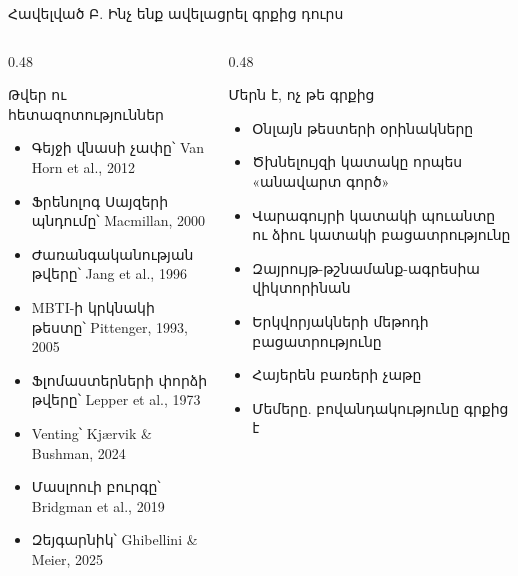 \begin{frame}{Հավելված Բ. Ինչ ենք ավելացրել գրքից դուրս}
  \begin{columns}[T]
    \begin{column}{0.48\textwidth}
      \begin{card}[colback=mint!30!cardwhite, fontupper=\scriptsize]
        {\blackfont Թվեր ու հետազոտություններ}\par\smallskip
        \begin{itemize}\setlength{\itemsep}{0.3mm}
          \item Գեյջի վնասի չափը՝ Van Horn et al., 2012
          \item Ֆրենոլոգ Սայզերի պնդումը՝ Macmillan, 2000
          \item Ժառանգականության թվերը՝ Jang et al., 1996
          \item MBTI-ի կրկնակի թեստը՝ Pittenger, 1993, 2005
          \item Ֆլոմաստերների փորձի թվերը՝ Lepper et al., 1973
          \item Venting՝ Kjærvik \& Bushman, 2024
          \item Մասլոուի բուրգը՝ Bridgman et al., 2019
          \item Զեյգարնիկ՝ Ghibellini \& Meier, 2025
        \end{itemize}
      \end{card}
    \end{column}
    \begin{column}{0.48\textwidth}
      \begin{card}[colback=peach!35!cardwhite, fontupper=\scriptsize]
        {\blackfont Մերն է, ոչ թե գրքից}\par\smallskip
        \begin{itemize}\setlength{\itemsep}{0.3mm}
          \item Օնլայն թեստերի օրինակները
          \item Ծխնելույզի կատակը որպես «անավարտ գործ»
          \item Վարագույրի կատակի պուանտը ու ձիու կատակի բացատրությունը
          \item Զայրույթ-թշնամանք-ագրեսիա վիկտորինան
          \item Երկվորյակների մեթոդի բացատրությունը
          \item Հայերեն բառերի չաթը
          \item Մեմերը. բովանդակությունը գրքից է
        \end{itemize}
      \end{card}
    \end{column}
  \end{columns}
\end{frame}

